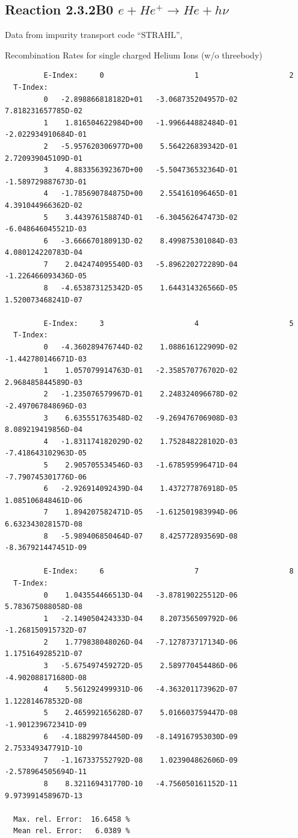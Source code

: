 \documentclass[12pt,dvips]{article}
\begin{document}
\subsection{
Reaction 2.3.2B0  $e + He^+ \rightarrow He + h\nu$
}
Data from impurity transport code ``STRAHL'', \cite{kn:Behringer}

  Recombination Rates for single charged Helium Ions (w/o threebody)


\begin{small}\begin{verbatim}
         E-Index:     0                     1                     2
  T-Index:
         0   -2.898866818182D+01   -3.068735204957D-02    7.818231657785D-02
         1    1.816504622984D+00   -1.996644882484D-01   -2.022934910684D-01
         2   -5.957620306977D+00    5.564226839342D-01    2.720939045109D-01
         3    4.883356392367D+00   -5.504736532364D-01   -1.589729887673D-01
         4   -1.785690784875D+00    2.554161096465D-01    4.391044966362D-02
         5    3.443976158874D-01   -6.304562647473D-02   -6.048646045521D-03
         6   -3.666670180913D-02    8.499875301084D-03    4.080124220783D-04
         7    2.042474095540D-03   -5.896220272289D-04   -1.226466093436D-05
         8   -4.653873125342D-05    1.644314326566D-05    1.520073468241D-07

         E-Index:     3                     4                     5
  T-Index:
         0   -4.360289476744D-02    1.088616122909D-02   -1.442780146671D-03
         1    1.057079914763D-01   -2.358570776702D-02    2.968485844589D-03
         2   -1.235076579967D-01    2.248324096678D-02   -2.497067848696D-03
         3    6.635551763548D-02   -9.269476706908D-03    8.089219419856D-04
         4   -1.831174182029D-02    1.752848228102D-03   -7.418643102963D-05
         5    2.905705534546D-03   -1.678595996471D-04   -7.790745301776D-06
         6   -2.926914092439D-04    1.437277876918D-05    1.085106848461D-06
         7    1.894207582471D-05   -1.612501983994D-06    6.632343028157D-08
         8   -5.989406850464D-07    8.425772893569D-08   -8.367921447451D-09

         E-Index:     6                     7                     8
  T-Index:
         0    1.043554466513D-04   -3.878190225512D-06    5.783675088058D-08
         1   -2.149050424333D-04    8.207356509792D-06   -1.268150915732D-07
         2    1.779838048026D-04   -7.127873717134D-06    1.175164928521D-07
         3   -5.675497459272D-05    2.589770454486D-06   -4.902088171680D-08
         4    5.561292499931D-06   -4.363201173962D-07    1.122814678532D-08
         5    2.465992165628D-07    5.016603759447D-08   -1.901239672341D-09
         6   -4.188299784450D-09   -8.149167953030D-09    2.753349347791D-10
         7   -1.167337552792D-08    1.023904862606D-09   -2.578964505694D-11
         8    8.321169431770D-10   -4.756050161152D-11    9.973991458967D-13

  Max. rel. Error:  16.6458 %
  Mean rel. Error:   6.0389 %

\end{verbatim}\end{small}
\end{document}
